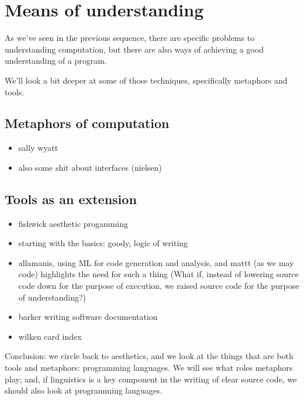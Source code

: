 \section{Means of understanding}

As we've seen in the previous sequence, there are specific problems to understanding computation, but there are also ways of achieving a good understanding of a program.

We'll look a bit deeper at some of those techniques, specifically metaphors and tools.

\subsection{Metaphors of computation}

\begin{itemize}
    \item sally wyatt
    \item also some shit about interfaces (nielsen)
\end{itemize}

\subsection{Tools as an extension}

\begin{itemize}
    \item fishwick aesthetic progamming
    \item starting with the basics: goody, logic of writing
    \item allamanis, using ML for code generation and analysis, and mattt (as we may code) highlights the need for such a thing (What if, instead of lowering source code down for the purpose of execution, we raised source code for the purpose of understanding?)
    \item barker writing software documentation
    \item wilken card index
\end{itemize}




\pagebreak

Conclusion: we circle back to aesthetics, and we look at the things that are both tools and metaphors: programming languages. We will see what roles metaphors play; and, if linguistics is a key component in the writing of clear source code, we should also look at programming languages.